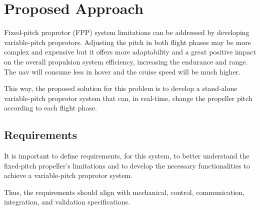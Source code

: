 \chapter{Proposed Approach}
\label{chap:Chapter4}

Fixed-pitch proprotor (FPP) system limitations can be addressed by developing variable-pitch proprotors.
Adjusting the pitch in both flight phases may be more complex and expensive but it offers more adaptability and a great positive impact on the overall propulsion system efficiency, increasing the endurance and range.
The \gls{uav} will consume less in hover and the cruise speed will be much higher.

This way, the proposed solution for this problem is to develop a stand-alone variable-pitch proprotor system that can, in real-time, change the propeller pitch according to each flight phase.


\section{Requirements}
It is important to define requirements, for this system, to better understand the fixed-pitch propeller's limitations and to develop the necessary functionalities to achieve a variable-pitch proprotor system.

Thus, the requirements should align with mechanical, control, communication, integration, and validation specifications.

